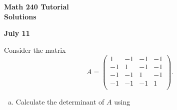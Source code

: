 \documentclass[a4paper,11pt]{article}
\begin{document}
\begin{center}
  {\Large\bfseries Math 240 Tutorial \\ Solutions}
\end{center}
\begin{center}
  {\bfseries July 11}
\end{center}

 Consider the matrix
\[
  A =
  \left(
    \begin{array}{rrrr}
      1 & -1 & -1 & -1 \\
      -1 & 1 & -1 & -1 \\
      -1 & -1 & 1 & -1 \\
      -1 & -1 & -1 & 1 \\
    \end{array}
  \right).
\]
\begin{enumerate}[(a)]
\item Calculate the determinant of $A$ using


\end{enumerate}
\end{document}

